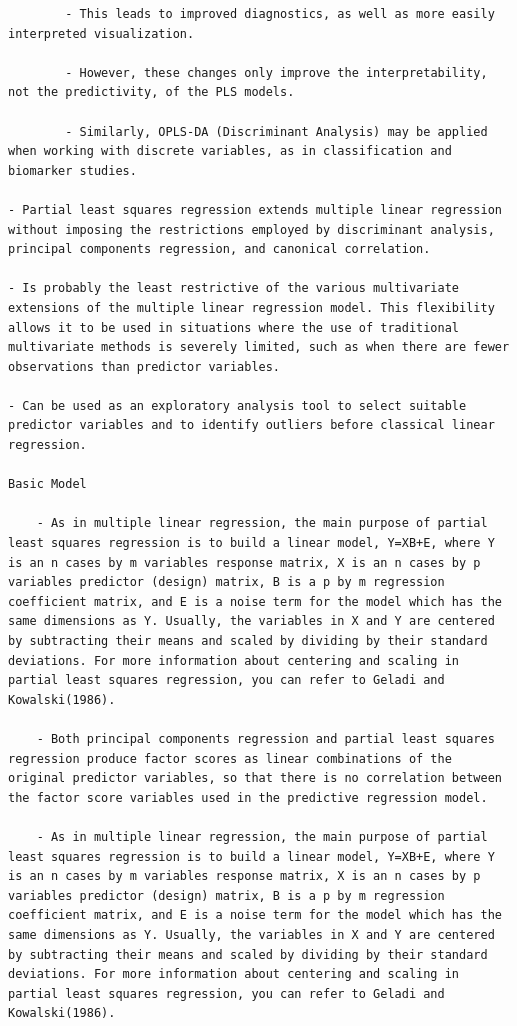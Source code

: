 \documentclass[
]{book}
\begin{document}
\begin{verbatim}
        - This leads to improved diagnostics, as well as more easily interpreted visualization.

        - However, these changes only improve the interpretability, not the predictivity, of the PLS models.

        - Similarly, OPLS-DA (Discriminant Analysis) may be applied when working with discrete variables, as in classification and biomarker studies.

- Partial least squares regression extends multiple linear regression without imposing the restrictions employed by discriminant analysis, principal components regression, and canonical correlation.

- Is probably the least restrictive of the various multivariate extensions of the multiple linear regression model. This flexibility allows it to be used in situations where the use of traditional multivariate methods is severely limited, such as when there are fewer observations than predictor variables.

- Can be used as an exploratory analysis tool to select suitable predictor variables and to identify outliers before classical linear regression.

Basic Model

    - As in multiple linear regression, the main purpose of partial least squares regression is to build a linear model, Y=XB+E, where Y is an n cases by m variables response matrix, X is an n cases by p variables predictor (design) matrix, B is a p by m regression coefficient matrix, and E is a noise term for the model which has the same dimensions as Y. Usually, the variables in X and Y are centered by subtracting their means and scaled by dividing by their standard deviations. For more information about centering and scaling in partial least squares regression, you can refer to Geladi and Kowalski(1986).

    - Both principal components regression and partial least squares regression produce factor scores as linear combinations of the original predictor variables, so that there is no correlation between the factor score variables used in the predictive regression model.

    - As in multiple linear regression, the main purpose of partial least squares regression is to build a linear model, Y=XB+E, where Y is an n cases by m variables response matrix, X is an n cases by p variables predictor (design) matrix, B is a p by m regression coefficient matrix, and E is a noise term for the model which has the same dimensions as Y. Usually, the variables in X and Y are centered by subtracting their means and scaled by dividing by their standard deviations. For more information about centering and scaling in partial least squares regression, you can refer to Geladi and Kowalski(1986).


\end{verbatim}
\end{document}
